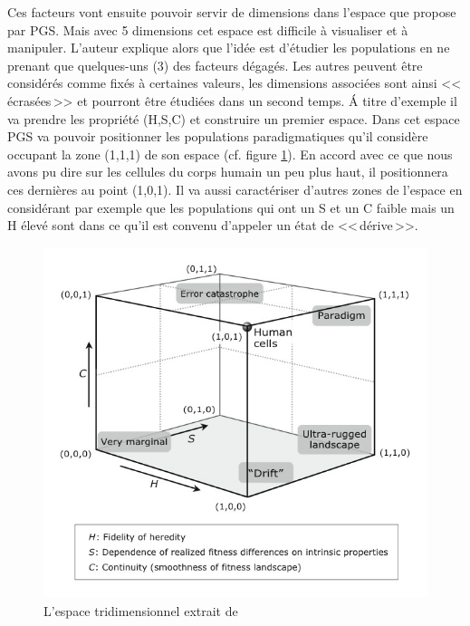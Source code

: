 Ces facteurs vont ensuite pouvoir servir de dimensions dans l'espace que propose par PGS. Mais avec 5 dimensions cet espace est difficile à visualiser et à manipuler. L'auteur explique alors que l'idée est d'étudier les populations en ne prenant que quelques-uns (3) des facteurs dégagés. Les autres peuvent être considérés comme fixés à certaines valeurs, les dimensions associées sont ainsi <<\,écrasées\,>> et pourront être étudiées dans un second temps. \'A titre d'exemple il va prendre les propriété (H,S,C) et construire un premier espace. Dans cet espace PGS va pouvoir positionner les populations paradigmatiques qu'il considère occupant la zone (1,1,1) de son espace (cf. figure \ref{fig:PGS}). En accord avec ce que nous avons pu dire sur les cellules du corps humain un peu plus haut, il positionnera ces dernières au point (1,0,1). Il va aussi caractériser d'autres zones de l'espace en considérant par exemple que les populations qui ont un S et un C faible mais un H élevé sont dans ce qu'il est convenu d'appeler un état de <<\,dérive\,>>. 

\begin{figure}[h]
	\begin{center}
		\includegraphics{./images/PGS.png}
	\end{center}
	\caption{L'espace tridimensionnel extrait de \citet[p.~64]{godfrey2009darwinian}}
	\label{fig:PGS}
\end{figure}

